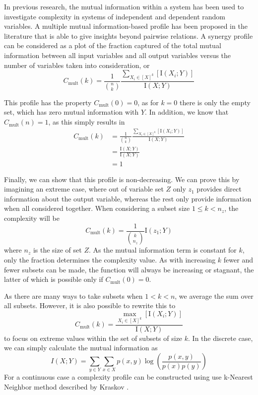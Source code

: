 \documentclass[../main.tex]{subfiles}
\begin{document}
In previous research, the mutual information within a system has been used to investigate complexity in systems of independent and dependent random variables.
A multiple mutual information-based profile has been proposed in the literature that is able to give insights beyond pairwise relations.
A synergy profile can be considered as a plot of the fraction captured of the total mutual information between all input variables and all output variables versus the number of variables taken into consideration, or
%
\begin{equation}
C_\mathrm{mult}(k) = \frac{1}{\binom{n}{k}}\frac{\sum_{X_i \in [X]^k} [\mathrm{I}(X_i;Y)]}{\mathrm{I}(X;Y)}
\end{equation}

This profile has the property $C_\mathrm{mult}(0) = 0$, as for $k = 0$ there is only the empty set, which has zero mutual information with $Y$.
In addition, we know that $C_\mathrm{mult}(n) = 1$, as this simply results in
%
\begin{align}
C_\mathrm{mult}(k) 
&= \frac{1}{\binom{n}{k}}\frac{\sum_{X_i \in [X]^k} [\mathrm{I}(X_i;Y)]}{\mathrm{I}(X;Y)} \\
&= \frac{\mathrm{I}(X;Y)}{\mathrm{I}(X;Y)} \\
&= 1
\end{align}

Finally, we can show that this profile is non-decreasing.
We can prove this by imagining an extreme case, where out of variable set $Z$ only $z_1$ provides direct information about the output variable, whereas the rest only provide information when all considered together.
When considering a subset size $1 \le k < n_z $, the complexity will be
%
\begin{equation}
C_\mathrm{mult}(k) = \frac{1}{\binom{k}{n_z}} \mathrm{I}(z_1;Y)
\end{equation}
%
where $n_z$ is the size of set $Z$.
As the mutual information term is constant for $k$, only the fraction determines the complexity value.
As with increasing $k$ fewer and fewer subsets can be made, the function will always be increasing or stagnant, the latter of which is possible only if $C_\mathrm{mult}(0) = 0$.

As there are many ways to take subsets when $1 < k < n$, we average the sum over all subsets.
However, it is also possible to rewrite this to
%
\begin{equation}
C_\mathrm{mult}(k) = \frac{\max_{X_i \in [X]^k} [\mathrm{I}(X_i;Y)]}{\mathrm{I}(X;Y)}
\end{equation}
%
to focus on extreme values within the set of subsets of size $k$.
In the discrete case, we can simply calculate the mutual information as
%
\begin{equation}
	I(X;Y) = \sum_{y \in Y} \sum_{x \in X} p(x,y) \log (\frac{p(x,y)}{p(x)p(y)})
\end{equation}
%
For a continuous case a complexity profile can be constructed using use k-Nearest Neighbor method described by Kraskov \cite{kraskov2004estimating}.
\end{document}
